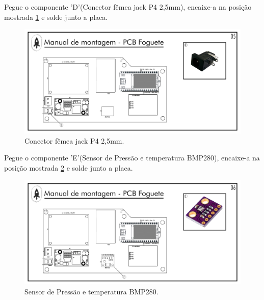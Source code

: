 \par Pegue o componente 'D'(Conector fêmea jack P4 2,5mm), encaixe-a na posição mostrada \ref{fig:PCIFoguete jack P4} e solde junto a placa.
\begin{figure}[H]
  \centering
  \includegraphics[width=\textwidth]{Figuras/FOGUETE/Pg-05---PL-02.png}
  \caption{Conector fêmea jack P4 2,5mm.}
  \label{fig:PCIFoguete jack P4}
\end{figure}

\newpage

\par Pegue o componente 'E'(Sensor de Pressão e temperatura BMP280), encaixe-a na posição mostrada \ref{fig:PCIFoguete BMP280} e solde junto a placa.
\begin{figure}[H]
  \centering
  \includegraphics[width=\textwidth]{Figuras/FOGUETE/Pg-06---PL-02.png}
  \caption{Sensor de Pressão e temperatura BMP280.}
  \label{fig:PCIFoguete BMP280}
\end{figure}


